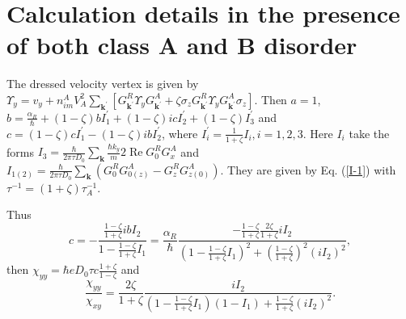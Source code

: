 \documentclass
[aps,pra,amsfonts,amssymb,twocolumn,amsmath,preprintnumbers,nofootinbib,floatfix,
showpacs,superscriptaddress]{revtex4-1}%
\begin{document}
\appendix


\section{Calculation details in the presence of both class A and B disorder}

The dressed velocity vertex is given by $\Upsilon_{y}=v_{y}+n_{im}^{A}%
V_{A}^{2}\sum_{\mathbf{k}^{\prime}}\left[  G_{\mathbf{k}^{\prime}}^{R}%
\Upsilon_{y}G_{\mathbf{k}^{\prime}}^{A}+\zeta\sigma_{z}G_{\mathbf{k}^{\prime}%
}^{R}\Upsilon_{y}G_{\mathbf{k}^{\prime}}^{A}\sigma_{z}\right]  $. Then $a=1$,
$b=\frac{\alpha_{R}}{\hbar}+\left(  1-\zeta\right)  bI_{1}^{\prime}+\left(
1-\zeta\right)  icI_{2}^{\prime}+\left(  1-\zeta\right)  I_{3}^{\prime}$ and
$c=\left(  1-\zeta\right)  cI_{1}^{\prime}-\left(  1-\zeta\right)
ibI_{2}^{\prime}$, where $I_{i}^{\prime}=\frac{1}{1+\zeta}I_{i},i=1,2,3$. Here
$I_{i}$ take the forms $I_{3}=\frac{\hbar}{2\pi\tau D_{0}}\sum_{\mathbf{k}%
}\frac{\hbar k_{y}}{m}2\operatorname{Re}G_{0}^{R}G_{x}^{A}$ and $I_{1\left(
2\right)  }=\frac{\hbar}{2\pi\tau D_{0}}\sum_{\mathbf{k}}\left(  G_{0}%
^{R}G_{0\left(  z\right)  }^{A}-G_{z}^{R}G_{z\left(  0\right)  }^{A}\right)
$. They are given by Eq. (\ref{I-1}) with $\tau^{-1}=\left(  1+\zeta\right)
\tau_{A}^{-1}$. 

Thus%
\[
c=-\frac{\frac{1-\zeta}{1+\zeta}ibI_{2}}{1-\frac{1-\zeta}{1+\zeta}I_{1}}%
=\frac{\alpha_{R}}{\hbar}\frac{-\frac{1-\zeta}{1+\zeta}\frac{2\zeta}{1+\zeta
}iI_{2}}{\left(  1-\frac{1-\zeta}{1+\zeta}I_{1}\right)  ^{2}+\left(
\frac{1-\zeta}{1+\zeta}\right)  ^{2}\left(  iI_{2}\right)  ^{2}},
\]
then $\chi_{yy}=\hbar eD_{0}\tau c\frac{1+\zeta}{1-\zeta}$ and
\[
\frac{\chi_{yy}}{\chi_{xy}}=\frac{2\zeta}{1+\zeta}\frac{iI_{2}}{\left(
1-\frac{1-\zeta}{1+\zeta}I_{1}\right)  \left(  1-I_{1}\right)  +\frac{1-\zeta
}{1+\zeta}\left(  iI_{2}\right)  ^{2}}.
\]
\end{document}
